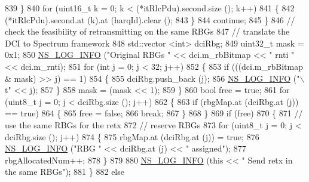 \begin{DoxyCode}
839                 \}
840               \textcolor{keywordflow}{for} (uint16\_t k = 0; k < (*itRlcPdu).second.size (); k++)
841                 \{
842                   (*itRlcPdu).second.at (k).at (harqId).clear ();
843                 \}
844               \textcolor{keywordflow}{continue};
845             \}
846           \textcolor{comment}{// check the feasibility of retransmitting on the same RBGs}
847           \textcolor{comment}{// translate the DCI to Spectrum framework}
848           std::vector <int> dciRbg;
849           uint32\_t mask = 0x1;
850           \hyperlink{group__logging_gafbd73ee2cf9f26b319f49086d8e860fb}{NS\_LOG\_INFO} (\textcolor{stringliteral}{"Original RBGs "} << dci.m\_rbBitmap << \textcolor{stringliteral}{" rnti "} << dci.m\_rnti);
851           \textcolor{keywordflow}{for} (\textcolor{keywordtype}{int} j = 0; j < 32; j++)
852             \{
853               \textcolor{keywordflow}{if} (((dci.m\_rbBitmap & mask) >> j) == 1)
854                 \{
855                   dciRbg.push\_back (j);
856                   \hyperlink{group__logging_gafbd73ee2cf9f26b319f49086d8e860fb}{NS\_LOG\_INFO} (\textcolor{stringliteral}{"\(\backslash\)t"} << j);
857                 \}
858               mask = (mask << 1);
859             \}
860           \textcolor{keywordtype}{bool} free = \textcolor{keyword}{true};
861           \textcolor{keywordflow}{for} (uint8\_t j = 0; j < dciRbg.size (); j++)
862             \{
863               \textcolor{keywordflow}{if} (rbgMap.at (dciRbg.at (j)) == \textcolor{keyword}{true})
864                 \{
865                   free = \textcolor{keyword}{false};
866                   \textcolor{keywordflow}{break};
867                 \}
868             \}
869           \textcolor{keywordflow}{if} (free)
870             \{
871               \textcolor{comment}{// use the same RBGs for the retx}
872               \textcolor{comment}{// reserve RBGs}
873               \textcolor{keywordflow}{for} (uint8\_t j = 0; j < dciRbg.size (); j++)
874                 \{
875                   rbgMap.at (dciRbg.at (j)) = \textcolor{keyword}{true};
876                   \hyperlink{group__logging_gafbd73ee2cf9f26b319f49086d8e860fb}{NS\_LOG\_INFO} (\textcolor{stringliteral}{"RBG "} << dciRbg.at (j) << \textcolor{stringliteral}{" assigned"});
877                   rbgAllocatedNum++;
878                 \}
879 
880               \hyperlink{group__logging_gafbd73ee2cf9f26b319f49086d8e860fb}{NS\_LOG\_INFO} (\textcolor{keyword}{this} << \textcolor{stringliteral}{" Send retx in the same RBGs"});
881             \}
882           \textcolor{keywordflow}{else}

\end{DoxyCode}
